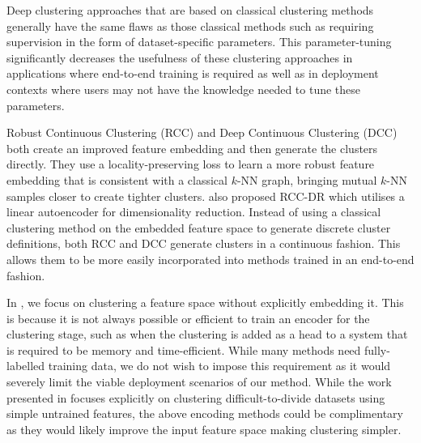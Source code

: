 \documentclass[../thesis.tex]{subfiles}
\begin{document}
Deep clustering approaches that are based on classical clustering methods generally have the same flaws as those classical methods such as requiring supervision in the form of dataset-specific parameters. This parameter-tuning significantly decreases the usefulness of these clustering approaches in applications where end-to-end training is required as well as in deployment contexts where users may not have the knowledge needed to tune these parameters.

Robust Continuous Clustering (RCC) \cite{Shah2018} and Deep Continuous Clustering (DCC) \cite{shah2018deep} both create an improved feature embedding and then generate the clusters directly. They use a locality-preserving loss to learn a more robust feature embedding that is consistent with a classical $k$-NN graph, bringing mutual $k$-NN samples closer to create tighter clusters. 
\citet{Shah2018} also proposed RCC-DR which utilises a linear autoencoder for dimensionality reduction.
Instead of using a classical clustering method on the embedded feature space to generate discrete cluster definitions, both RCC and DCC generate clusters in a continuous fashion. This allows them to be more easily incorporated into methods trained in an end-to-end fashion.

In , we focus on clustering a feature space without explicitly embedding it. This is because it is not always possible or efficient to train an encoder for the clustering stage, such as when the clustering is added as a head to a system that is required to be memory and time-efficient. 
While many methods need fully-labelled training data, we do not wish to impose this requirement as it would severely limit the viable deployment scenarios of our method.
While the work presented in  focuses explicitly on clustering difficult-to-divide datasets using simple untrained features, the above encoding methods could be complimentary as they would likely improve the input feature space making clustering simpler. 
\end{document}
